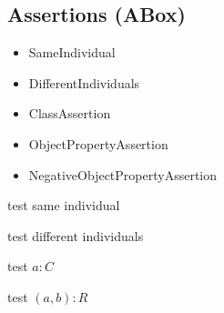 \documentclass[paper.tex]{subfiles}
\begin{document}

\subsection{Assertions (ABox)}

\begin{itemize}[noitemsep]
  \ttfamily
  \item SameIndividual
  \item DifferentIndividuals
  \item ClassAssertion
  \item ObjectPropertyAssertion
  \item NegativeObjectPropertyAssertion
\end{itemize}

\begin{algorithm}[H]
  \caption{test same individual}
  \begin{algorithmic}[1]
    \raggedright
      \State \todo
    \EndFunction
  \end{algorithmic}
\end{algorithm}

\begin{algorithm}[H]
  \caption{test different individuals}
  \begin{algorithmic}[1]
    \raggedright
      \State \todo
    \EndFunction
  \end{algorithmic}
\end{algorithm}

\begin{algorithm}[H]
  \caption{test $a : C$}
  \begin{algorithmic}[1]
    \raggedright
      \State \todo
    \EndFunction
  \end{algorithmic}
\end{algorithm}

\begin{algorithm}[H]
  \caption{test $(a, b) : R$}
  \begin{algorithmic}[1]
    \raggedright
      \State \todo
    \EndFunction
  \end{algorithmic}
\end{algorithm}
\end{document}
